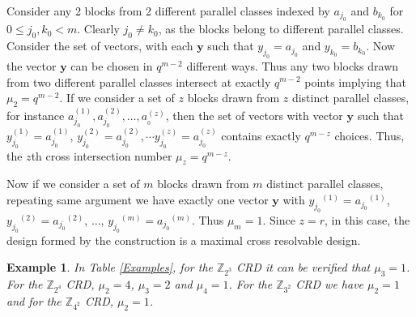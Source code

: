 \documentclass[conference]{IEEEtran}
\newtheorem{exmp}{Example}
\begin{document}
\begin{IEEEproof}
Consider any 2 blocks from 2 different parallel classes indexed by $a_{j_0}$ and $b_{k_0}$ for $0 \leq j_0,k_0 <m$. Clearly $j_0 \neq k_0$, as the blocks belong to different parallel classes. Consider the set of vectors, with each $\textbf{y}$ such that $y_{j_0} = a_{j_0} $ and  $y_{k_0} = b_{k_0}$. Now the vector $\textbf{y}$ can be chosen in $q^{m-2}$ different ways. Thus any two blocks drawn from two different parallel classes intersect at exactly $q^{m-2}$ points implying that $\mu_{2} = q^{m-2}$. If we consider a set of $z$ blocks drawn from $z$ distinct parallel classes, for instance $a_{j_0}^{(1)}, a_{j_0}^{(2)}, \dots , a_{_0}^{(z)}$, then the set of vectors with vector $\textbf{y}$ such that $y_{j_{0}}^{(1)} =a_{j_0}^{(1)}$, $y_{j_{0}}^{(2)} =a_{j_0}^{(2)}, \cdots y_{j_{0}}^{(z)} = a_{j_0}^{(z)}$ contains exactly  $q^{m-z}$ choices. Thus, the $z$th cross intersection number $\mu_{z} = q^{m-z}$.

Now if we consider a set of $m$ blocks drawn from $m$ distinct parallel classes, repeating same argument we have exactly one vector $\textbf{y}$ with ${y_{j_{0}}}^{(1)} = {a_{j_0}}^{(1)}$, ${y_{j_{0}}}^{(2)} ={a_{j_0}}^{(2)} $, $\dots$,  ${y_{j_{0}}}^{(m)} = {a_{j_0}}^{(m)}$. Thus  $\mu_{m} = 1$. Since $z = r$, in this case, the design formed by the construction is a maximal cross resolvable design.

\end{IEEEproof}
	\begin{exmp}
		In Table \ref{Examples}, for  the $\mathbb{Z}_{2^3}$ CRD it can be verified that $\mu_3 = 1$. For the $\mathbb{Z}_{2^4}$ CRD,  $\mu_{2} = 4$, $\mu_{3} = 2$ and $\mu_{4} = 1$. For the $\mathbb{Z}_{3^2}$ CRD we have 	$\mu_{2} = 1$ and for the $\mathbb{Z}_{4^2}$ CRD, $\mu_{2} = 1$.	
    \end{exmp}
\end{document}
